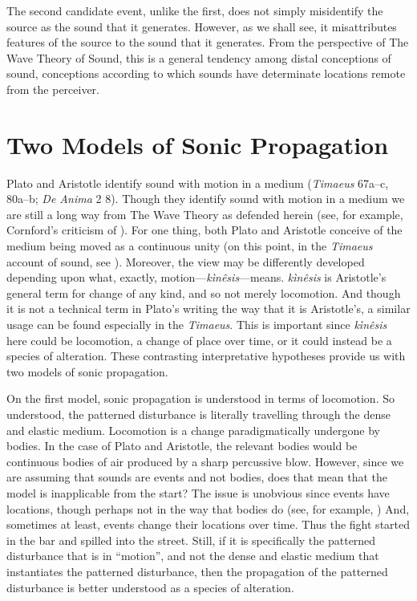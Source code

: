 \documentclass[12pt]{article}
\begin{document}
The second candidate event, unlike the first, does not simply misidentify the source as the sound that it generates. However, as we shall see, it misattributes features of the source to the sound that it generates. From the perspective of The Wave Theory of Sound, this is a general tendency among distal conceptions of sound, conceptions according to which sounds have determinate locations remote from the perceiver. 


\section{Two Models of Sonic Propagation} %
\label{sec:two_models_of_sonic_propagation}

Plato and Aristotle identify sound with motion in a medium (\emph{Timaeus} 67a–c, 80a–b; \emph{De Anima} 2 8). Though they identify sound with motion in a medium we are still a long way from The Wave Theory as defended herein (see, for example, Cornford's \citeyear[320 n.1]{Cornford:1935fk} criticism of \citealt{Archer-Hind:1888qd}). For one thing, both Plato and Aristotle conceive of the medium being moved as a continuous unity (on this point, in the \emph{Timaeus} account of sound, see \citealt[109]{Beare:1906uq}). Moreover, the view may be differently developed depending upon what, exactly, motion---\emph{kìnêsis}---means. \emph{kìnêsis} is Aristotle's general term for change of any kind, and so not merely locomotion. And though it is not a technical term in Plato's writing the way that it is Aristotle's, a similar usage can be found especially in the \emph{Timaeus}. This is important since \emph{kìnêsis} here could be locomotion, a change of place over time, or it could instead be a species of alteration. These contrasting interpretative hypotheses provide us with two models of sonic propagation.

On the first model, sonic propagation is understood in terms of locomotion. So understood, the patterned disturbance is literally travelling through the dense and elastic medium. Locomotion is a change paradigmatically undergone by bodies. In the case of Plato and Aristotle, the relevant bodies would be continuous bodies of air produced by a sharp percussive blow. However, since we are assuming that sounds are events and not bodies, does that mean that the model is inapplicable from the start? The issue is unobvious since events have locations, though perhaps not in the way that bodies do (see, for example, \citealt{Davidson:1969da}) And, sometimes at least, events change their locations over time. Thus the fight started in the bar and spilled into the street. Still, if it is specifically the patterned disturbance that is in ``motion'', and not the dense and elastic medium that instantiates the patterned disturbance, then the propagation of the patterned disturbance is better understood as a species of alteration.
\end{document}
